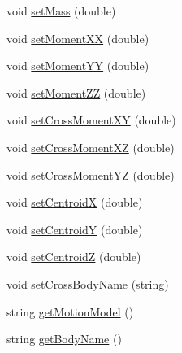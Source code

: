 \begin{DoxyCompactItemize}
\item 
void \hyperlink{class_body_a896b660a9d001422f5d2b0b4e6d77b98}{set\-Mass} (double)
\item 
void \hyperlink{class_body_a741a229a3671a7cf3d399a4e5d02596c}{set\-Moment\-X\-X} (double)
\item 
void \hyperlink{class_body_a06cdb969a55ebeff8d83ffcae66ab4ed}{set\-Moment\-Y\-Y} (double)
\item 
void \hyperlink{class_body_a270e3714cad10195b7dadc749727dba7}{set\-Moment\-Z\-Z} (double)
\item 
void \hyperlink{class_body_a24ddd15ae01d27675788658e65fcb199}{set\-Cross\-Moment\-X\-Y} (double)
\item 
void \hyperlink{class_body_a5f75e49f031e7b3dd711dd8e9d25eee8}{set\-Cross\-Moment\-X\-Z} (double)
\item 
void \hyperlink{class_body_ab99551cb3c2183db44ef86304b2e134b}{set\-Cross\-Moment\-Y\-Z} (double)
\item 
void \hyperlink{class_body_aca9af7a0a510f0a1ee9b0b29f7ed0217}{set\-Centroid\-X} (double)
\item 
void \hyperlink{class_body_a86f41f3de49b7e79c2387d92bb124204}{set\-Centroid\-Y} (double)
\item 
void \hyperlink{class_body_ad778b4919794533f12cfb93e818d5759}{set\-Centroid\-Z} (double)
\item 
void \hyperlink{class_body_a38933b2aec94873355dcecc8f8b41db2}{set\-Cross\-Body\-Name} (string)
\item 
string \hyperlink{class_body_ab4340cac445ae26ae751a08c35155386}{get\-Motion\-Model} ()
\item 
string \hyperlink{class_body_aab63febbe35984d8551a188b40ee3c3f}{get\-Body\-Name} ()
\end{DoxyCompactItemize}
